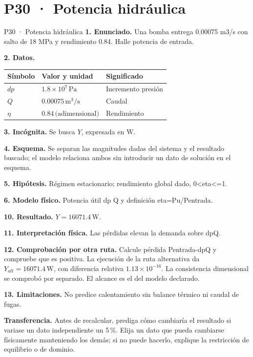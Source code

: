 \chapter*{P30 · Potencia hidráulica}
\begin{studiumworked}{P30 · Potencia hidráulica}
\textbf{1. Enunciado.} Una bomba entrega 0.00075 m3/s con salto de 18 MPa y rendimiento 0.84. Halle potencia de entrada.

\textbf{2. Datos.}
\begin{longtable}{p{.16\linewidth}p{.35\linewidth}p{.38\linewidth}}\toprule Símbolo & Valor y unidad & Significado\\\midrule\endhead
$dp$ & $1.8\times10^{7}\,\mathrm{Pa}$ & Incremento presión\\
$Q$ & $0.00075\,\mathrm{m^3/s}$ & Caudal\\
$\eta$ & $0.84\,\text{(adimensional)}$ & Rendimiento\\
\bottomrule\end{longtable}
\textbf{3. Incógnita.} Se busca $Y$, expresada en $\mathrm W$.

\textbf{4. Esquema.} Se separan las magnitudes dadas del sistema y el resultado buscado; el modelo relaciona ambos sin introducir un dato de solución en el esquema.

\textbf{5. Hipótesis.} Régimen estacionario; rendimiento global dado, 0<eta<=1.

\textbf{6. Modelo físico.} Potencia útil dp Q y definición eta=Pu/Pentrada.


\textbf{10. Resultado.} $Y=16071.4\,\mathrm W$.

\textbf{11. Interpretación física.} Las pérdidas elevan la demanda sobre dpQ.

\textbf{12. Comprobación por otra ruta.} Calcule pérdida Pentrada-dpQ y compruebe que es positiva. La ejecución de la ruta alternativa da $Y_{alt}=16071.4\,\mathrm W$, con diferencia relativa $1.13\times10^{-16}$. La consistencia dimensional se comprobó por separado. El alcance es el del modelo declarado.

\textbf{13. Limitaciones.} No predice calentamiento sin balance térmico ni caudal de fugas.

\textbf{Transferencia.} Antes de recalcular, prediga cómo cambiaría el resultado si variase un dato independiente un 5\,\%. Elija un dato que pueda cambiarse físicamente manteniendo los demás; si no puede hacerlo, explique la restricción de equilibrio o de dominio.\par
\end{studiumworked}


